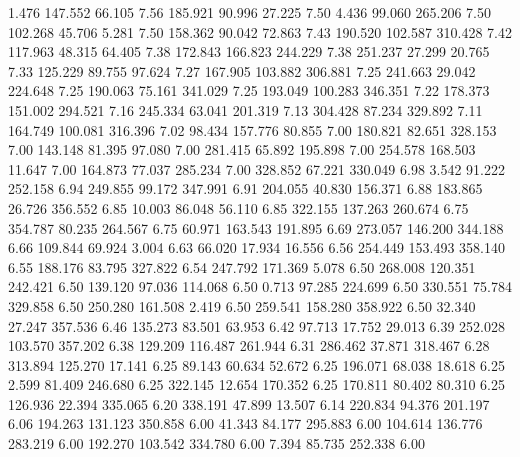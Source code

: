    1.476  147.552   66.105         7.56
 185.921   90.996   27.225         7.50
   4.436   99.060  265.206         7.50
 102.268   45.706    5.281         7.50
 158.362   90.042   72.863         7.43
 190.520  102.587  310.428         7.42
 117.963   48.315   64.405         7.38
 172.843  166.823  244.229         7.38
 251.237   27.299   20.765         7.33
 125.229   89.755   97.624         7.27
 167.905  103.882  306.881         7.25
 241.663   29.042  224.648         7.25
 190.063   75.161  341.029         7.25
 193.049  100.283  346.351         7.22
 178.373  151.002  294.521         7.16
 245.334   63.041  201.319         7.13
 304.428   87.234  329.892         7.11
 164.749  100.081  316.396         7.02
  98.434  157.776   80.855         7.00
 180.821   82.651  328.153         7.00
 143.148   81.395   97.080         7.00
 281.415   65.892  195.898         7.00
 254.578  168.503   11.647         7.00
 164.873   77.037  285.234         7.00
 328.852   67.221  330.049         6.98
   3.542   91.222  252.158         6.94
 249.855   99.172  347.991         6.91
 204.055   40.830  156.371         6.88
 183.865   26.726  356.552         6.85
  10.003   86.048   56.110         6.85
 322.155  137.263  260.674         6.75
 354.787   80.235  264.567         6.75
  60.971  163.543  191.895         6.69
 273.057  146.200  344.188         6.66
 109.844   69.924    3.004         6.63
  66.020   17.934   16.556         6.56
 254.449  153.493  358.140         6.55
 188.176   83.795  327.822         6.54
 247.792  171.369    5.078         6.50
 268.008  120.351  242.421         6.50
 139.120   97.036  114.068         6.50
   0.713   97.285  224.699         6.50
 330.551   75.784  329.858         6.50
 250.280  161.508    2.419         6.50
 259.541  158.280  358.922         6.50
  32.340   27.247  357.536         6.46
 135.273   83.501   63.953         6.42
  97.713   17.752   29.013         6.39
 252.028  103.570  357.202         6.38
 129.209  116.487  261.944         6.31
 286.462   37.871  318.467         6.28
 313.894  125.270   17.141         6.25
  89.143   60.634   52.672         6.25
 196.071   68.038   18.618         6.25
   2.599   81.409  246.680         6.25
 322.145   12.654  170.352         6.25
 170.811   80.402   80.310         6.25
 126.936   22.394  335.065         6.20
 338.191   47.899   13.507         6.14
 220.834   94.376  201.197         6.06
 194.263  131.123  350.858         6.00
  41.343   84.177  295.883         6.00
 104.614  136.776  283.219         6.00
 192.270  103.542  334.780         6.00
   7.394   85.735  252.338         6.00
